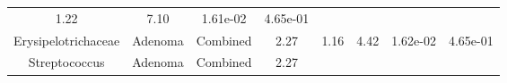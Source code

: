 \documentclass[12pt,]{article}
\begin{document}
\begin{longtable}[]{@{}cccccccc@{}}
\begin{minipage}[t]{0.14\columnwidth}
1.22\strut
\end{minipage} & \begin{minipage}[t]{0.14\columnwidth}\centering\strut
7.10\strut
\end{minipage} & \begin{minipage}[t]{0.06\columnwidth}\centering\strut
1.61e-02\strut
\end{minipage} & \begin{minipage}[t]{0.06\columnwidth}\centering\strut
4.65e-01\strut
\end{minipage}\tabularnewline
\begin{minipage}[t]{0.18\columnwidth}\centering\strut
Erysipelotrichaceae\strut
\end{minipage} & \begin{minipage}[t]{0.07\columnwidth}\centering\strut
Adenoma\strut
\end{minipage} & \begin{minipage}[t]{0.09\columnwidth}\centering\strut
Combined\strut
\end{minipage} & \begin{minipage}[t]{0.03\columnwidth}\centering\strut
2.27\strut
\end{minipage} & \begin{minipage}[t]{0.14\columnwidth}\centering\strut
1.16\strut
\end{minipage} & \begin{minipage}[t]{0.14\columnwidth}\centering\strut
4.42\strut
\end{minipage} & \begin{minipage}[t]{0.06\columnwidth}\centering\strut
1.62e-02\strut
\end{minipage} & \begin{minipage}[t]{0.06\columnwidth}\centering\strut
4.65e-01\strut
\end{minipage}\tabularnewline
\begin{minipage}[t]{0.18\columnwidth}\centering\strut
Streptococcus\strut
\end{minipage} & \begin{minipage}[t]{0.07\columnwidth}\centering\strut
Adenoma\strut
\end{minipage} & \begin{minipage}[t]{0.09\columnwidth}\centering\strut
Combined\strut
\end{minipage} & \begin{minipage}[t]{0.03\columnwidth}\centering\strut
2.27\strut
\end{minipage} & \begin{minipage}[t]{0.14\columnwidth}\centering\strut

\end{minipage}
\end{longtable}
\end{document}
